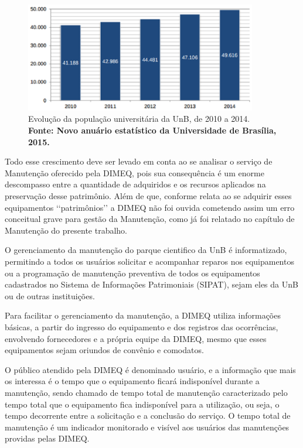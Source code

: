 \graphicspath{{figuras/}}
\begin{figure}[H]
\centering
\includegraphics[width=0.9\textwidth]{grafico_dimeq2.eps}
\caption{Evolução da população universitária da UnB, de 2010 a 2014. \textbf{Fonte: Novo anuário estatístico da Universidade de Brasília, 2015.}}
\label{grafico_dimeq2}
\end{figure}

Todo esse crescimento deve ser levado em conta ao se analisar o serviço de Manutenção oferecido pela DIMEQ, pois sua consequência é um enorme descompasso entre a quantidade de adquiridos e os recursos aplicados na preservação desse patrimônio. Além de que, conforme relata \cite{limacastilho2006} ao se adquirir esses equipamentos {\lq\lq patrimônios\rq\rq} a DIMEQ não foi ouvida cometendo assim um erro conceitual grave para gestão da Manutenção, como já foi relatado no capítulo de Manutenção do presente trabalho.
	
O gerenciamento da manutenção do parque cientifico da UnB é informatizado, permitindo a todos os usuários solicitar e acompanhar reparos nos equipamentos ou a programação de manutenção preventiva de todos os equipamentos cadastrados no Sistema de Informações Patrimoniais (SIPAT), sejam eles da UnB ou de outras instituições. 
	
Para facilitar o gerenciamento da manutenção, a DIMEQ utiliza informações básicas, a partir do ingresso do equipamento e dos registros das ocorrências, envolvendo fornecedores e a própria equipe da DIMEQ, mesmo que esses equipamentos sejam oriundos de convênio e comodatos.
	
O público atendido pela DIMEQ é denominado usuário, e a informação que mais os interessa é o tempo que o equipamento ficará indisponível durante a manutenção, sendo chamado de tempo total de manutenção caracterizado pelo tempo total que o equipamento fica indisponível para a utilização, ou seja, o tempo decorrente entre a solicitação e a conclusão do serviço. O tempo total de manutenção é um indicador monitorado e visível aos usuários das manutenções providas pelas DIMEQ.

